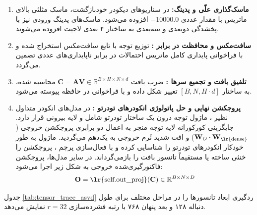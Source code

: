 \begin{enumerate}
    \item \textbf{ماسک‌گذاری علّی و پدینگ:}
    در سناریوهای دیکودر خودبازگشت، ماسک مثلثی بالای ماتریس با مقدار عددی $-10000.0$ افزوده می‌شود. ماسک‌های پدینگ ورودی نیز با پخشدگی دو‌بعدی و سه‌بعدی به ساختار ۴ بعدی لاجیت افزوده می‌شوند.
    \item \textbf{سافت‌مکس و محافظت در برابر :}
    توزیع توجه با تابع سافت‌مکس استخراج شده و با فراخوانی  پایداری کامل ماتریس احتمالات در برابر ناپایداری‌های عددی تضمین می‌گردد.
    \item \textbf{تلفیق بافت و تجمیع سرها :}
    ضرب بافت $\mathbf{C} = \mathbf{A} \mathbf{V} \in \mathbb{R}^{B \times H \times N \times d}$ محاسبه شده، به ساختار $[B, N, H \cdot d]$ تغییر شکل داده و با فراخوانی  در حافظه پیوسته می‌شود.
    \item \textbf{پروجکشن نهایی و حل پاتولوژی انکودرهای تودرتو :}
    در مدل‌های انکودر متداول نظیر ، ماژول توجه درون یک ساختار تودرتو شامل  و لایه بیرونی  قرار دارد. جایگزینی کورکورانه لایه توجه منجر به اعمال دو برابری پروجکشن خروجی ($\mathbf{W}_O \cdot \mathbf{W}_{\text{\lr{dense}}}$) و افت شدید نُرم خروجی به یک‌دهم می‌گردید. ماژول  به طور خودکار انکودرهای تودرتو را شناسایی کرده و با فعال‌سازی پرچم ، پروجکشن  را خنثی ساخته یا مستقیماً تانسور بافت را بازمی‌گرداند. در سایر مدل‌ها، پروجکشن فاکتورگیری‌شده خروجی به شکل زیر اجرا می‌شود:
    \begin{equation}
    \mathbf{O} = \text{\lr{self.out\_proj}}(\mathbf{C}) \in \mathbb{R}^{B \times N \times D}
    \end{equation}
\end{enumerate}

جدول \ref{tab:tensor_trace_asvd} ردگیری ابعاد تانسورها را در مراحل مختلف برای طول دنباله ۱۲۸ و بعد پنهان ۷۶۸ با رتبه فشرده‌سازی $r=32$ نمایش می‌دهد.

